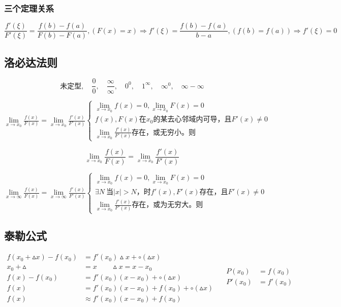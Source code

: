 \subsubsection{三个定理关系}
$$\frac{f'(\xi)}{F'(\xi)}=\frac{f(b)-f(a)}{F(b)-F(a)},(F(x)=x)\Rightarrow f'(\xi)=\frac{f(b)-f(a)}{b-a},(f(b)=f(a))\Rightarrow f'(\xi)=0$$
\subsection{洛必达法则}
$$\mbox{未定型},\quad\frac{0}{0},\quad\frac{\infty}{\infty},\quad0^0,\quad1^\infty,\quad\infty^0,\quad\infty-\infty$$
\begin{center}
    $\lim\limits_{x\to x_0}\frac{f(x)}{F(x)}=\lim\limits_{x\to x_0}\frac{f'(x)}{F'(x)}\begin{cases}
    \lim\limits_{x\to x_0}f(x)=0,\lim\limits_{x\to x_0}F(x)=0\\
    f(x),F(x)\mbox{在}x_0\mbox{的某去心邻域内可导，且}F'(x)\neq 0\\
    \lim\limits_{x\to x_0}\frac{f'(x)}{F'(x)}\mbox{存在，或无穷小。则}
\end{cases}$
\end{center}
\begin{equation}
    \lim\limits_{x\to x_0}\frac{f(x)}{F(x)}=\lim\limits_{x\to x_0}\frac{f'(x)}{F'(x)}\label{l'hospital rule}
\end{equation}
    \begin{center}
        $\lim\limits_{x\to \infty}\frac{f(x)}{F(x)}=\lim\limits_{x\to \infty}\frac{f'(x)}{F'(x)}\begin{cases}
        \lim\limits_{x\to x_0}f(x)=0,\lim\limits_{x\to x_0}F(x)=0\\
        \exists N\ \mbox{当}\left|x\right|>N\mbox{，时}f'(x),F'(x)\mbox{存在，且}F'(x)\neq 0\\
        \lim\limits_{x\to x_0}\frac{f'(x)}{F'(x)}\mbox{存在，或为无穷大。则}
    \end{cases}$
\end{center}
\subsection{泰勒公式}
\begin{displaymath}
    \begin{split}
        f(x_0+\vartriangle x)-f(x_0)&=f'(x_0)\vartriangle x +\circ (\vartriangle x)\\
        x_0+\vartriangle &= x \qquad \vartriangle x= x-x_0\\
        f(x)-f(x_0)&=f'(x_0)(x-x_0) +\circ (\vartriangle x)\\
        f(x)&=f'(x_0)(x-x_0)+f(x_0)+\circ (\vartriangle x)\\
        f(x)&\approx f'(x_0)(x-x_0)+f(x_0)
    \end{split}\quad
    \begin{split}
        P(x_0)&=f(x_0) \\
        P'(x_0)&=f'(x_0)\\
    \end{split}
\end{displaymath}
